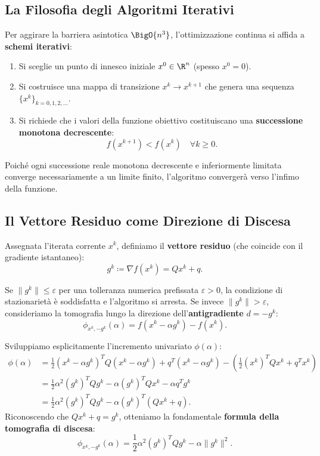 \subsection{La Filosofia degli Algoritmi Iterativi}
Per aggirare la barriera asintotica $\BigO{n^3}$, l'ottimizzazione continua si affida a \textbf{schemi iterativi}:
\begin{enumerate}
    \item Si sceglie un punto di innesco iniziale $x^0 \in \R^n$ (spesso $x^0 = 0$).
    \item Si costruisce una mappa di transizione $x^k \to x^{k+1}$ che genera una sequenza $\{x^k\}_{k=0, 1, 2, \dots}$.
    \item Si richiede che i valori della funzione obiettivo costituiscano una \textbf{successione monotona decrescente}:
    \begin{equation}
        f(x^{k+1}) < f(x^k) \quad \forall k \ge 0.
    \end{equation}
\end{enumerate}
Poich\'e ogni successione reale monotona decrescente e inferiormente limitata converge necessariamente a un limite finito, l'algoritmo converger\`a verso l'infimo della funzione.

\subsection{Il Vettore Residuo come Direzione di Discesa}
Assegnata l'iterata corrente $x^k$, definiamo il \textbf{vettore residuo} (che coincide con il gradiente istantaneo):
\begin{equation}
    g^k \coloneqq \nabla f(x^k) = Q x^k + q.
\end{equation}

Se $\|g^k\| \le \varepsilon$ per una tolleranza numerica prefissata $\varepsilon > 0$, la condizione di stazionariet\`a \`e soddisfatta e l'algoritmo si arresta.
Se invece $\|g^k\| > \varepsilon$, consideriamo la tomografia lungo la direzione dell'\textbf{antigradiente} $d = -g^k$:
\begin{equation}
    \phi_{x^k, -g^k}(\alpha) = f(x^k - \alpha g^k) - f(x^k).
\end{equation}

Sviluppiamo esplicitamente l'incremento univariato $\phi(\alpha)$:
\begin{align}
    \phi(\alpha) &= \frac{1}{2} (x^k - \alpha g^k)^T Q (x^k - \alpha g^k) + q^T (x^k - \alpha g^k) - \left( \frac{1}{2} (x^k)^T Q x^k + q^T x^k \right) \nonumber \\
    &= \frac{1}{2} \alpha^2 (g^k)^T Q g^k - \alpha (g^k)^T Q x^k - \alpha q^T g^k \nonumber \\
    &= \frac{1}{2} \alpha^2 (g^k)^T Q g^k - \alpha (g^k)^T (Q x^k + q).
\end{align}
Riconoscendo che $Q x^k + q = g^k$, otteniamo la fondamentale \textbf{formula della tomografia di discesa}:
\begin{equation}
    \phi_{x^k, -g^k}(\alpha) = \frac{1}{2} \alpha^2 (g^k)^T Q g^k - \alpha \|g^k\|^2.
    \label{eq:tomografia-antigradiente}
\end{equation}

